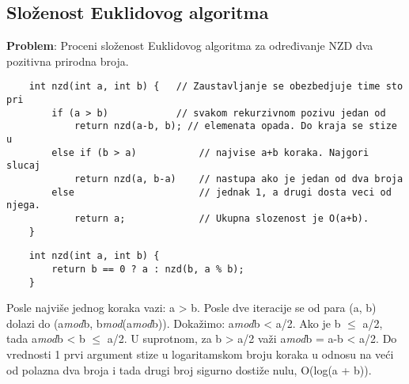 \documentclass{article}
\begin{document}
\subsection{Složenost Euklidovog algoritma}
\textbf{Problem}: Proceni složenost Euklidovog algoritma za određivanje NZD dva pozitivna prirodna broja.
\begin{lstlisting}
    int nzd(int a, int b) {   // Zaustavljanje se obezbedjuje time sto pri 
        if (a > b)            // svakom rekurzivnom pozivu jedan od
            return nzd(a-b, b); // elemenata opada. Do kraja se stize u 
        else if (b > a)           // najvise a+b koraka. Najgori slucaj 
            return nzd(a, b-a)    // nastupa ako je jedan od dva broja 
        else                      // jednak 1, a drugi dosta veci od njega.
            return a;             // Ukupna slozenost je O(a+b).
    }
\end{lstlisting}

\begin{lstlisting}
    int nzd(int a, int b) {
        return b == 0 ? a : nzd(b, a % b);
    }
\end{lstlisting}
Posle najviše jednog koraka vazi: a > b. Posle dve iteracije se od para (a, b) dolazi do (a\textit{mod}b, b\textit{mod}(a\textit{mod}b)). Dokažimo: a\textit{mod}b < a/2. Ako je b $\leq$ a/2, tada a\textit{mod}b < b $\leq$ a/2. U suprotnom, za b > a/2 važi a\textit{mod}b = a-b < a/2. Do vrednosti 1 prvi argument stize u logaritamskom broju koraka u odnosu na veći od polazna dva broja i tada drugi broj sigurno dostiže nulu, O(log(a + b)).
\end{document}
